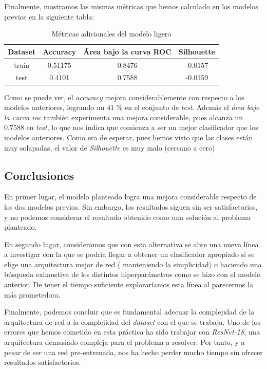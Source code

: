 \documentclass[11pt]{article}
\begin{document}
Finalmente, mostramos las mismas métricas que hemos calculado en los modelos previos en la siguiente tabla: 

\begin{table}[H]
  \begin{center}
      \begin{tabular}{|c|c|c|c|}
          \hline
          Dataset & Accuracy & Área bajo la curva ROC & Silhouette \\
          \hline
          train & 0.51175 &  0.8476 & -0.0157\\
          test & 0.4101 & 0.7588 &  -0.0159 \\
          \hline
      \end{tabular}
  \end{center}
     \caption{Métricas adicionales del modelo ligero}
  \end{table}

Como se puede ver, el \emph{accuracy} mejora considerablemente con respecto a los modelos anteriores, logrando un 41 \% en el conjunto de \emph{test}. Además el \emph{área bajo la curva roc} también experimenta una mejora considerable, pues alcanza un $0.7588$ en \emph{test}, lo que nos indica que comienza a ser un mejor clasificador que los modelos anteriores. Como era de esperar, pues hemos visto que las clases están muy solapadas, el valor de \emph{Silhouette} es muy malo (cercano a cero)

\subsection{Conclusiones}

En primer lugar, el modelo planteado logra una mejora considerable respecto de los dos modelos previos. Sin embargo, los resultados siguen sin ser satisfactorios, y no podemos considerar el resultado obtenido como una solución al problema planteado.

En segundo lugar, consideramos que con esta alternativa se abre una nueva línea a investigar con la que se podría llegar a obtener un clasificador apropiado si se elige una arquitectura mejor de red ( manteniendo la simplicidad) o haciendo una búsqueda exhaustiva de los distintos hiperparámetros como se hizo con el modelo anterior. De tener el tiempo suficiente exploraríamos esta línea al parecernos la más prometedora.

Finalmente, podemos concluir que es fundamental adecuar la complejidad de la arquitectura de red a la complejidad del \emph{dataset} con el que se trabaja. Uno de los errores que hemos cometido en esta práctica ha sido trabajar con \emph{ResNet-18}, una arquitectura demasiado compleja para el problema a resolver. Por tanto, y a pesar de ser una red pre-entrenada, nos ha hecho perder mucho tiempo sin ofrecer resultados satisfactorios.
\end{document}
